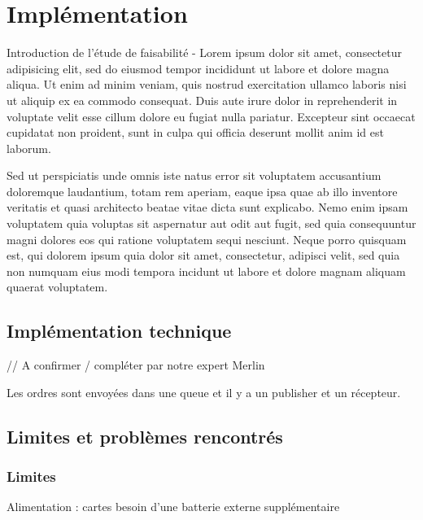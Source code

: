 	\chapter{Implémentation}

Introduction de l'étude de faisabilité - Lorem ipsum dolor sit amet, consectetur adipisicing elit, sed do eiusmod tempor incididunt ut labore et dolore magna aliqua. Ut enim ad minim veniam, quis nostrud exercitation ullamco laboris nisi ut aliquip ex ea commodo consequat. Duis aute irure dolor in reprehenderit in voluptate velit esse cillum dolore eu fugiat nulla pariatur. Excepteur sint occaecat cupidatat non proident, sunt in culpa qui officia deserunt mollit anim id est laborum.

	Sed ut perspiciatis unde omnis iste natus error sit voluptatem accusantium doloremque laudantium, totam rem aperiam, eaque ipsa quae ab illo inventore veritatis et quasi architecto beatae vitae dicta sunt explicabo. Nemo enim ipsam voluptatem quia voluptas sit aspernatur aut odit aut fugit, sed quia consequuntur magni dolores eos qui ratione voluptatem sequi nesciunt. Neque porro quisquam est, qui dolorem ipsum quia dolor sit amet, consectetur, adipisci velit, sed quia non numquam eius modi tempora incidunt ut labore et dolore magnam aliquam quaerat voluptatem.
	
		\section{Implémentation technique}

// A confirmer / compléter par notre expert Merlin

Les ordres sont envoyées dans une queue et il y a un publisher et un récepteur.

		\section{Limites et problèmes rencontrés}

			\subsection{Limites}

Alimentation : cartes besoin d'une batterie externe supplémentaire 

